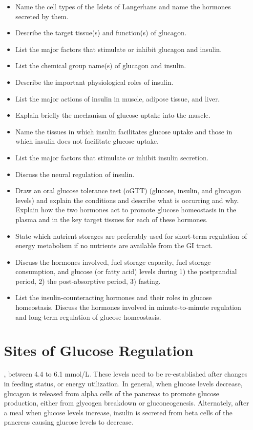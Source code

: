 \documentclass{tufte-handout}
\begin{document}
\begin{itemize}
\item Name the cell types of the Islets of Langerhans and name the hormones secreted by them.
\item Describe the target tissue(s) and function(s) of glucagon.
\item List the major factors that stimulate or inhibit glucagon and insulin.
\item List the chemical group name(s) of glucagon and insulin.
\item Describe the important physiological roles of insulin.
\item List the major actions of insulin in muscle, adipose tissue, and liver.
\item Explain briefly the mechanism of glucose uptake into the muscle.
\item Name the tissues in which insulin facilitates glucose uptake and those in which insulin does not facilitate glucose uptake.
\item List the major factors that stimulate or inhibit insulin secretion.
\item Discuss the neural regulation of insulin.
\item Draw an oral glucose tolerance test (oGTT)  (glucose, insulin, and glucagon levels) and explain the conditions and describe what is occurring and why.  Explain how the two hormones act to promote glucose homeostasis in the plasma and in the key target tissues for each of these hormones.
\item State which nutrient storages are preferably used for short-term regulation of energy metabolism if no nutrients are available from the GI tract.
\item Discuss the hormones involved, fuel storage capacity, fuel storage consumption, and glucose (or fatty acid) levels during 1) the postprandial period, 2) the post-absorptive period, 3) fasting.
\item List the insulin-counteracting hormones and their roles in glucose homeostasis. Discuss the hormones involved in minute-to-minute regulation and long-term regulation of glucose homeostasis.

\end{itemize}

\section{Sites of Glucose Regulation}

, between 4.4 to 6.1 mmol/L.  These levels need to be re-established after changes in feeding status, or energy utilization.  In general, when glucose levels decrease, glucagon is released from alpha cells of the pancreas to promote glucose production, either from glycogen breakdown or gluconeogenesis.  Alternately, after a meal when glucose levels increase, insulin is secreted from beta cells of the pancreas causing glucose levels to decrease.
\end{document}
